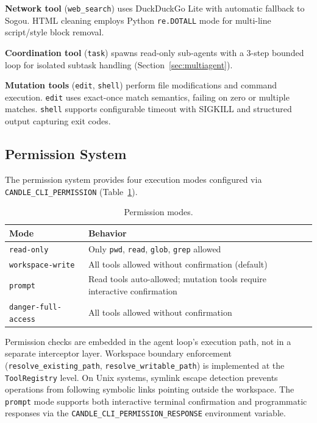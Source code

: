\documentclass[11pt]{article}
\begin{document}
\textbf{Network tool} (\texttt{web\_search}) uses DuckDuckGo Lite with automatic fallback to Sogou. HTML cleaning employs Python \texttt{re.DOTALL} mode for multi-line script/style block removal.

\textbf{Coordination tool} (\texttt{task}) spawns read-only sub-agents with a 3-step bounded loop for isolated subtask handling (Section~\ref{sec:multiagent}).

\textbf{Mutation tools} (\texttt{edit}, \texttt{shell}) perform file modifications and command execution. \texttt{edit} uses exact-once match semantics, failing on zero or multiple matches. \texttt{shell} supports configurable timeout with SIGKILL and structured output capturing exit codes.

\subsection{Permission System}

The permission system provides four execution modes configured via \texttt{CANDLE\_CLI\_PERMISSION} (Table~\ref{tab:perms}).

\begin{table}[h]
\centering
\caption{Permission modes.}
\label{tab:perms}
\begin{tabular}{@{}ll@{}}
\toprule
\textbf{Mode} & \textbf{Behavior} \\
\midrule
\texttt{read-only}          & Only \texttt{pwd}, \texttt{read}, \texttt{glob}, \texttt{grep} allowed \\
\texttt{workspace-write}    & All tools allowed without confirmation (default) \\
\texttt{prompt}             & Read tools auto-allowed; mutation tools require interactive confirmation \\
\texttt{danger-full-access} & All tools allowed without confirmation \\
\bottomrule
\end{tabular}
\end{table}

Permission checks are embedded in the agent loop's execution path, not in a separate interceptor layer. Workspace boundary enforcement (\texttt{resolve\_existing\_path}, \texttt{resolve\_writable\_path}) is implemented at the \texttt{ToolRegistry} level. On Unix systems, symlink escape detection prevents operations from following symbolic links pointing outside the workspace. The \texttt{prompt} mode supports both interactive terminal confirmation and programmatic responses via the \texttt{CANDLE\_CLI\_PERMISSION\_RESPONSE} environment variable.
\end{document}
